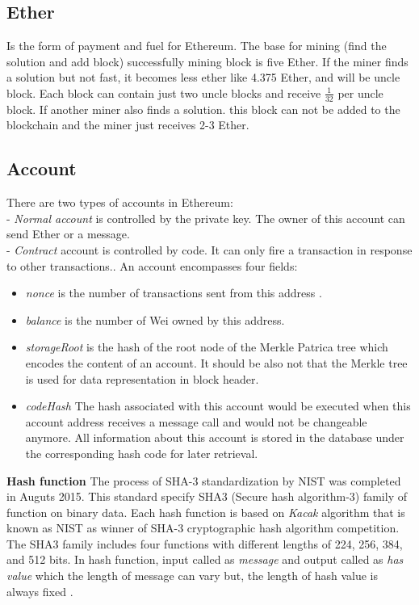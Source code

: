 \subsection{Ether}
 Is the form of payment and fuel for Ethereum. The base for mining (find the solution and add block) successfully mining block is five Ether. If the miner finds a solution but not fast, it becomes less ether like 4.375 Ether, and will be uncle block. Each block can contain just two uncle blocks and receive $\frac{1}{32}$ per uncle block. If another miner also finds a solution. this block can not be added to the blockchain and the miner just receives 2-3 Ether\cite{Egbertsen}. 
\subsection{Account}
There are two types of accounts in Ethereum:\\
- \textit{Normal account} is controlled by the private key. The owner of this account can send Ether or a message.\\
- \textit{Contract} account is controlled by code. It can only fire a transaction in response to other transactions.\cite{Egbertsen}. An account encompasses four fields:\\
 \begin{itemize}
     \item \textit{nonce} is the number of transactions sent from this address \cite{Gavin}.
     \item \textit{balance} is the number of Wei owned by this address\cite{Gavin}.
     \item \textit{storageRoot} is the hash of the root node of the Merkle Patrica tree which encodes the content of an account. It should be also not that the Merkle tree is used for data representation in block header\cite{Gavin}.
     \item \textit{codeHash}
     The hash associated with this account would be executed when this account address receives a message call and would not be changeable anymore. All information about this account is stored in the database under the corresponding hash code for later retrieval. \\
    
\end{itemize}
\textbf{Hash function}
The process of SHA-3 standardization by NIST was completed in Auguts 2015.
This standard specify SHA3 (Secure hash algorithm-3) family of function on binary data. Each hash function is based on \textit{Kacak} algorithm that is known as NIST as winner of SHA-3 cryptographic hash algorithm competition. The SHA3 family includes four functions with different lengths of 224, 256, 384, and 512 bits. 
In hash function, input called as \textit{message} and output called as  \textit{has value} which the length of message can vary but, the length of hash value is always fixed \cite{Fips}.\\

